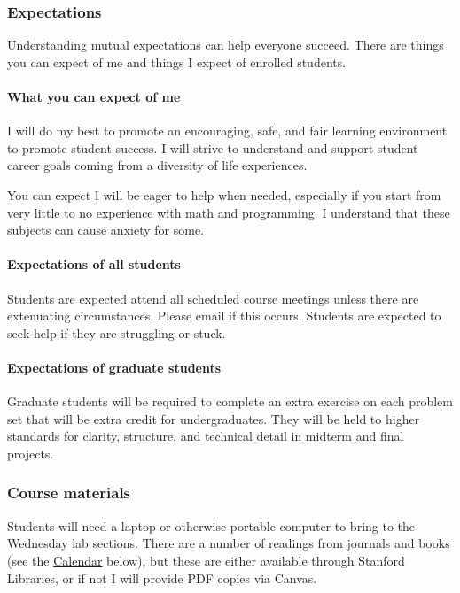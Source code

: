 \documentclass[letterpaper]{article}
\begin{document}
\subsubsection{Expectations}\label{expectations}

Understanding mutual expectations can help everyone succeed. There are
things you can expect of me and things I expect of enrolled students.

\paragraph{What you can expect of me}\label{what-you-can-expect-of-me}

I will do my best to promote an encouraging, safe, and fair learning
environment to promote student success. I will strive to understand and
support student career goals coming from a diversity of life
experiences.

You can expect I will be eager to help when needed, especially if you
start from very little to no experience with math and programming. I
understand that these subjects can cause anxiety for some.

\paragraph{Expectations of all
students}\label{expectations-of-all-students}

Students are expected attend all scheduled course meetings unless there
are extenuating circumstances. Please email if this occurs. Students are
expected to seek help if they are struggling or stuck.

\paragraph{Expectations of graduate
students}\label{expectations-of-graduate-students}

Graduate students will be required to complete an extra exercise on each
problem set that will be extra credit for undergraduates. They will be
held to higher standards for clarity, structure, and technical detail in
midterm and final projects.

\subsubsection{Course materials}\label{course-materials}

Students will need a laptop or otherwise portable computer to bring to
the Wednesday lab sections. There are a number of readings from journals
and books (see the \href{./\#Calendar}{Calendar} below), but these are
either available through Stanford Libraries, or if not I will provide
PDF copies via Canvas.
\end{document}
